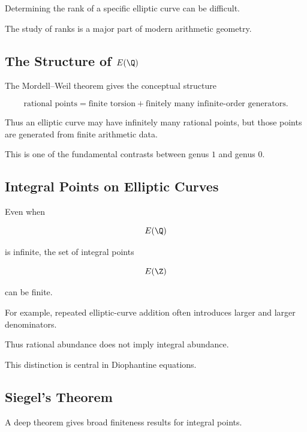 Determining the rank of a specific elliptic curve can be difficult.

The study of ranks is a major part of modern arithmetic geometry.

\subsection{The Structure of \(E(\Q)\)}
\label{subsec:structure-rational-elliptic-points}

The Mordell--Weil theorem gives the conceptual structure

\[
\boxed{
\text{rational points}
=
\text{finite torsion}
+
\text{finitely many infinite-order generators}.
}
\]

Thus an elliptic curve may have infinitely many rational points, but those
points are generated from finite arithmetic data.

This is one of the fundamental contrasts between genus \(1\) and genus \(0\).

\subsection{Integral Points on Elliptic Curves}
\label{subsec:integral-points-elliptic}

Even when

\[ E(\Q) \]

is infinite, the set of integral points

\[ E(\Z) \]

can be finite.

For example, repeated elliptic-curve addition often introduces larger and
larger denominators.

Thus rational abundance does not imply integral abundance.

This distinction is central in Diophantine equations.

\subsection{Siegel's Theorem}
\label{subsec:siegel-theorem}

A deep theorem gives broad finiteness results for integral points.

